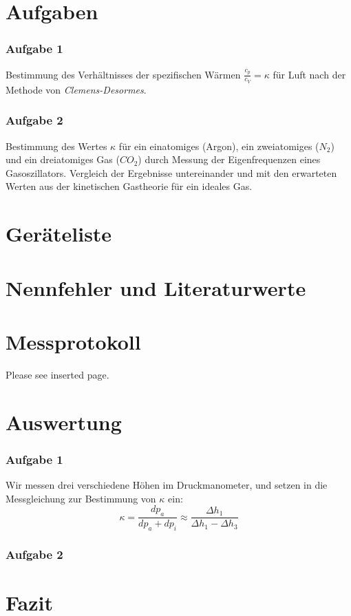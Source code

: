 \documentclass[%
   final,      %
   paper=a4, paper=portrait, pagesize=auto, %
   fontsize=11pt, %
   ngerman, %
 ]{scrartcl} %
\begin{document}
\section{Aufgaben}
\subsubsection{Aufgabe 1}
Bestimmung des Verhältnisses der spezifischen Wärmen $\frac{c_p}{c_V} = \kappa$ für Luft nach der Methode von \emph{Clemens-Desormes}.
\subsubsection{Aufgabe 2}
Bestimmung des Wertes $\kappa$ für ein einatomiges (Argon), ein zweiatomiges ($N_2$) und ein dreiatomiges Gas ($CO_2$) durch Messung der Eigenfrequenzen eines Gasoszillators.
Vergleich der Ergebnisse untereinander und mit den erwarteten Werten aus der kinetischen Gastheorie für ein ideales Gas.
\section{Geräteliste}
\section{Nennfehler und Literaturwerte}
\section{Messprotokoll}
Please see inserted page.
\section{Auswertung}
\subsubsection{Aufgabe 1}
Wir messen drei verschiedene Höhen im Druckmanometer, und setzen in die Messgleichung zur Bestimmung von $\kappa$ ein:
\begin{equation}
\kappa = \frac{dp_a}{dp_a + dp_i}\approx \frac{\Delta h_1}{\Delta h_1 - \Delta h_3}
\end{equation}
\subsubsection{Aufgabe 2}
\section{Fazit}
\end{document}

